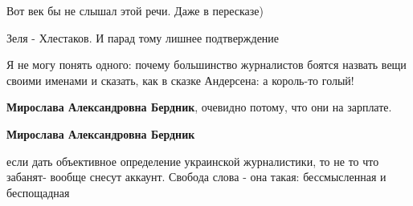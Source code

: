\begin{itemize}
 
Вот век бы не слышал этой речи. Даже в пересказе)

 
Зеля - Хлестаков. И парад тому лишнее подтверждение

 

Я не могу понять одного: почему большинство журналистов боятся назвать вещи
своими именами и сказать, как в сказке Андерсена: а король-то голый!

\begin{itemize}
 
\textbf{Мирослава Александровна Бердник}, очевидно потому, что они на зарплате.

 
\textbf{Мирослава Александровна Бердник} 

если дать объективное определение украинской журналистики, то не то что
забанят- вообще снесут аккаунт. Свобода слова - она такая: бессмысленная и
беспощадная

\end{itemize}

 


\end{itemize}
